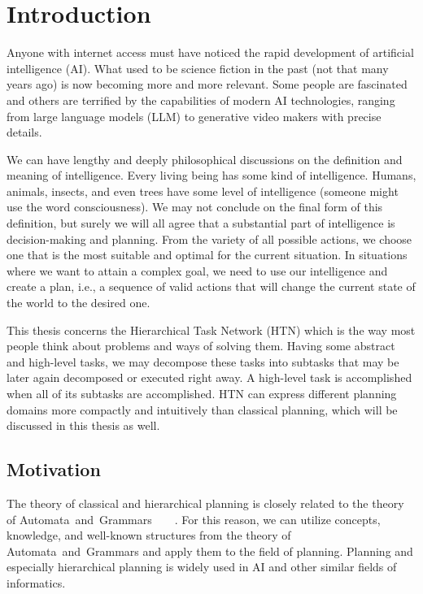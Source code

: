 \chapter*{Introduction}

\noindent
Anyone with internet access must have noticed the rapid development of artificial intelligence (AI). What used to be science fiction in the past (not that many years ago) is now becoming more and more relevant. Some people are fascinated and others are terrified by the capabilities of modern AI technologies, ranging from large language models (LLM) to generative video makers with precise details.

\medskip\noindent
We can have lengthy and deeply philosophical discussions on the definition and meaning of intelligence. Every living being has some kind of intelligence. Humans, animals, insects, and even trees have some level of intelligence (someone might use the word consciousness). We may not conclude on the final form of this definition, but surely we will all agree that a substantial part of intelligence is decision-making and planning. From the variety of all possible actions, we choose one that is the most suitable and optimal for the current situation. In situations where we want to attain a complex goal, we need to use our intelligence and create a plan, i.e., a sequence of valid actions that will change the current state of the world to the desired one.

\medskip\noindent
This thesis concerns the Hierarchical Task Network (HTN) which is the way most people think about problems and ways of solving them. Having some abstract and high-level tasks, we may decompose these tasks into subtasks that may be later again decomposed or executed right away. A high-level task is accomplished when all of its subtasks are accomplished. HTN can express different planning domains more compactly and intuitively than classical planning, which will be discussed in this thesis as well.

\section*{Motivation}

\noindent
The theory of classical and hierarchical planning is closely related to the theory of Automata~and~Grammars~\cite{chytil}~\cite{complexity}~\cite{langclassification}~\cite{cmyk}. For this reason, we can utilize concepts, knowledge, and well-known structures from the theory of Automata~and~Grammars and apply them to the field of planning. Planning and especially hierarchical planning is widely used in AI and other similar fields of informatics.

